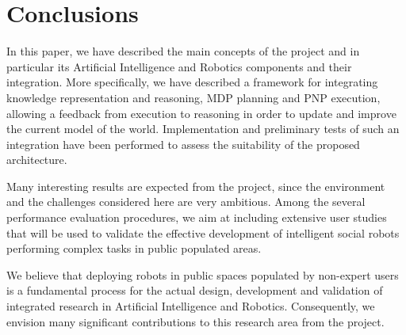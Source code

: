 \section{Conclusions}
\label{sec:conclu}

In this paper, we have described the main concepts of the \coaches project and in particular its Artificial Intelligence and Robotics components and their integration. 
More specifically, we have described a framework for integrating knowledge representation and reasoning, MDP planning and PNP execution, allowing a feedback from execution to reasoning in order to update and improve the current model of the world. 
Implementation and preliminary tests of such an integration have been performed to assess the suitability of the proposed architecture.

Many interesting results are expected from the \coaches project, since the environment and the challenges considered here are very ambitious. 
Among the several performance evaluation procedures, we aim at including extensive user studies that will be used to validate the effective development of intelligent social robots performing complex tasks in public populated areas. 

We believe that deploying robots in public spaces populated by non-expert users is a fundamental process for the actual design, development and validation of integrated research in Artificial Intelligence and Robotics. Consequently, we envision many significant contributions to this research area from the \coaches project.





